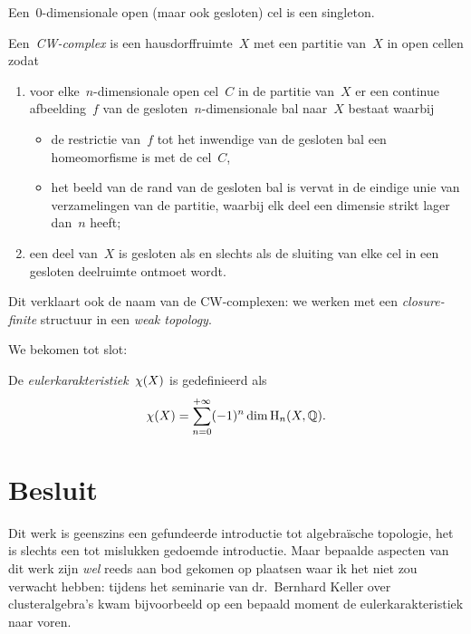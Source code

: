 \documentclass[a4paper,11pt,openany,oneside,article]{memoir}
\begin{document}
\begin{remark}
  Een~$0$\nobreakdash-dimensionale open (maar ook gesloten) cel is een singleton.
\end{remark}

\begin{definition}
  Een~\emph{CW\nobreakdash-complex} is een hausdorffruimte~$X$ met een partitie van~$X$ in open cellen zodat
  \begin{enumerate}
    \item voor elke~$n$\nobreakdash-dimensionale open cel~$C$ in de partitie van~$X$ er een continue afbeelding~$f$ van de gesloten~$n$\nobreakdash-dimensionale bal naar~$X$ bestaat waarbij
      \begin{itemize}
        \item de restrictie van~$f$ tot het inwendige van de gesloten bal een homeomorfisme is met de cel~$C$,
        \item het beeld van de rand van de gesloten bal is vervat in de eindige unie van verzamelingen van de partitie, waarbij elk deel een dimensie strikt lager dan~$n$ heeft;
      \end{itemize}
    \item een deel van~$X$ is gesloten als en slechts als de sluiting van elke cel in een gesloten deelruimte ontmoet wordt.
  \end{enumerate}
\end{definition}

Dit verklaart ook de naam van de CW\nobreakdash-complexen: we werken met een \emph{closure-finite} structuur in een \emph{weak topology}.

We bekomen tot slot:

\begin{definition}
  De \emph{eulerkarakteristiek}~$\chi(X)$ is gedefinieerd als
  \begin{equation}
    \chi(X)=\sum_{n=0}^{+\infty}(-1)^n\dim\mathrm{H}_n(X,\mathbb{Q}).
  \end{equation}
\end{definition}

\clearpage

\section{Besluit}
Dit werk is geenszins een gefundeerde introductie tot algebra\"ische topologie, het is slechts een tot mislukken gedoemde introductie. Maar bepaalde aspecten van dit werk zijn \emph{wel} reeds aan bod gekomen op plaatsen waar ik het niet zou verwacht hebben: tijdens het seminarie van dr.~Bernhard Keller over clusteralgebra's kwam bijvoorbeeld op een bepaald moment de eulerkarakteristiek naar voren.

\nocite{*}


\end{document}
